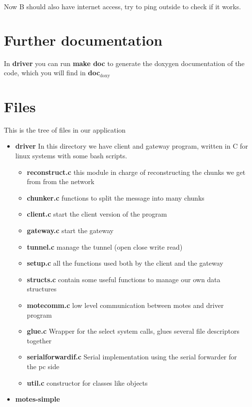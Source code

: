 \documentclass[11pt]{article}
\begin{document}
  
  Now B should also have internet access, try to ping outside to check if it works.
\section*{Further documentation}
\label{sec-3}

  In \textbf{driver} you can run \textbf{make doc} to generate the doxygen documentation of the code, which you will find in \textbf{doc$_{\mathrm{doxy}}$}
\section*{Files}
\label{sec-4}

  This is the tree of files in our application
\begin{itemize}
\item \textbf{driver}
    In this directory we have client and gateway program, written in C for linux systems with some bash scripts.

\begin{itemize}
\item \textbf{reconstruct.c}
      this module in charge of reconstructing the chunks we get from from the network
\item \textbf{chunker.c}
      functions to split the message into many chunks
\item \textbf{client.c}
      start the client version of the program
\item \textbf{gateway.c}
      start the gateway
\item \textbf{tunnel.c}
      manage the tunnel (open close write read)
\item \textbf{setup.c}
      all the functions used both by the client and the gateway
\item \textbf{structs.c}
      contain some useful functions to manage our own data structures
\item \textbf{motecomm.c}
      low level communication between motes and driver program
\item \textbf{glue.c}
      Wrapper for the select system calls, glues several file descriptors together
\item \textbf{serialforwardif.c}
      Serial implementation using the serial forwarder for the pc side
\item \textbf{util.c}
      constructor for classes like objects
\end{itemize}

\item \textbf{motes-simple}


\end{itemize}
\end{document}
